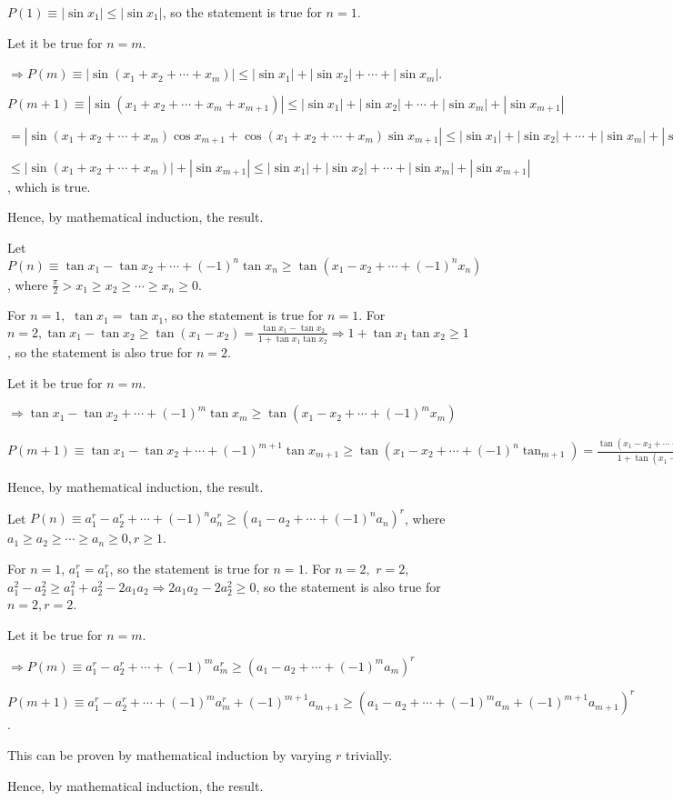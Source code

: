   $P(1)\equiv |\sin x_1|\leq |\sin x_1|$, so the statement is true for $n = 1$.

  Let it be true for $n = m$.

  $\Rightarrow P(m)\equiv |\sin(x_1 + x_2 + \cdots + x_m)|\leq |\sin x_1| + |\sin x_2| + \cdots + |\sin
  x_m|$.

  $P(m + 1)\equiv |\sin(x_1 + x_2 + \cdots + x_m + x_{m + 1})|\leq |\sin x_1| + |\sin x_2| + \cdots + |\sin
  x_m| + |\sin x_{m + 1}|$

  $= |\sin(x_1 + x_2 + \cdots + x_m)\cos x_{m + 1} + \cos(x_1 + x_2 + \cdots + x_m)\sin x_{m + 1}|\leq |\sin
  x_1| + |\sin x_2| + \cdots + |\sin x_m| + |\sin x_{m + 1}|$

  $\leq |\sin(x_1 + x_2 + \cdots + x_m)| + |\sin x_{m + 1}|\leq |\sin x_1| + |\sin x_2| + \cdots + |\sin
  x_m| + |\sin x_{m + 1}|$, which is true.

  Hence, by mathematical induction, the result.
\item Let $P(n) \equiv \tan x_1 - \tan x_2 + \cdots + (-1)^n\tan x_n \geq \tan(x_1 - x_2 + \cdots + (-1)^nx_n)$,
  where $\frac{\pi}{2}> x_1\geq x_2\geq \cdots \geq x_n\geq 0$.

  For $n = 1,$ $\tan x_1 = \tan x_1$, so the statement is true for $n = 1$. For $n = 2, \tan x_1 - \tan x_2 \geq
  \tan(x_1 - x_2) = \frac{\tan x_1 - \tan x_2}{1 + \tan x_1\tan x_2} \Rightarrow 1 + \tan x_1\tan x_2\geq
  1$, so the statement is also true for $n = 2$.

  Let it be true for $n = m$.

  $\Rightarrow \tan x_1 -\tan x_2 + \cdots + (-1)^m\tan x_m \geq \tan(x_1 - x_2 + \cdots + (-1)^mx_m)$

  $P(m + 1)\equiv \tan x_1 - \tan x_2 + \cdots + (-1)^{m + 1}\tan x_{m + 1}\geq \tan(x_1 - x_2 + \cdots +
  (-1)^n\tan_{m + 1}) = \frac{\tan (x_1 - x_2 + \cdots + (-1)^mx_m) - (-1)^{m + 1}\tan x_{m + 1}}{1 +
    \tan(x_1 - x_2 + \cdots + (-1)^mx_m)\tan x_{m + 1}}\leq \tan(x_1 - x_2 + \cdots + (-1)^mx_m)$

  Hence, by mathematical induction, the result.
\item Let $P(n)\equiv a_1^r - a_2^r + \cdots +(-1)^na_n^r\geq (a_1 - a_2 + \cdots +(-1)^na_n)^r$, where
  $a_1\geq a_2\geq \cdots \geq a_n \geq 0, r\geq 1$.

  For $n = 1$, $a_1^r = a_1^r$, so the statement is true for $n = 1$. For $n = 2,$ $r = 2$, $a_1^2 -
  a_2^2\geq a_1^2 + a_2^2 - 2a_1a_2 \Rightarrow 2a_1a_2 - 2a_2^2\geq 0$, so the statement is also true for
  $n = 2, r = 2$.

  Let it be true for $n = m$.

  $\Rightarrow P(m) \equiv  a_1^r - a_2^r + \cdots +(-1)^ma_m^r\geq (a_1 - a_2 + \cdots +(-1)^ma_m)^r$

  $P(m + 1)\equiv a_1^r - a_2^r + \cdots +(-1)^ma_m^r + (-1)^{m + 1}a_{m + 1}\geq (a_1 - a_2 + \cdots
  +(-1)^ma_m + (-1)^{m + 1}a_{m + 1})^r$.

  This can be proven by mathematical induction by varying $r$ trivially.

  Hence, by mathematical induction, the result.
\stopitemize

